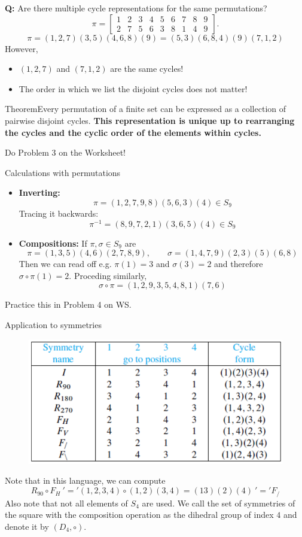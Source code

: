 \documentclass{beamer}
\def\bl[#1]#2{\begin{block}{#1}#2\end{block}}
\def\itemb{\begin{itemize}}
\def\iteme{\end{itemize}}
\begin{document}
\begin{frame}
\textbf{Q:} Are there multiple cycle representations for the same permutations?
\[
\pi=\left[\begin{array}{ccccccccc}
1&2&3&4&5&6&7&8&9\\
2&7&5&6&3&8&1&4&9
\end{array}\right].
\]
\[
\pi=(1,2,7)(3,5)(4,6,8)(9)=(5,3)(6,8,4)(9)(7,1,2)
\]
However,
\itemb
\item $(1,2,7)$ and $(7,1,2)$ are the same cycles!
\item The order in which we list the disjoint cycles does not matter!
\iteme

\bl[Theorem]{Every permutation of a finite set can be expressed as a collection of pairwise disjoint cycles. \textbf{This representation is unique up to rearranging the cycles and the cyclic order of the elements within cycles.}}
\center Do Problem 3 on the Worksheet!
\end{frame}

\begin{frame}{Calculations with permutations}
\itemb
\item \textbf{Inverting:}
\[
\pi=(1,2,7,9,8)(5,6,3)(4)\in S_9
\]
Tracing it backwards:
\[
\pi^{-1}=(8,9,7,2,1)(3,6,5)(4)\in S_9
\]
\item \textbf{Compositions:}
If $\pi,\sigma\in S_9$ are
\[
\pi=(1,3,5)(4,6)(2,7,8,9),\qquad \sigma=(1,4,7,9)(2,3)(5)(6,8)
\]
Then we can read off e.g. $\pi(1)=3$ and $\sigma(3)=2$ and therefore $\sigma\circ\pi(1)=2$. Proceding similarly,
\[
\sigma\circ\pi=(1,2,9,3,5,4,8,1)(7,6)
\]
\iteme

\begin{center}
Practice this in Problem 4 on WS.
\end{center}
\end{frame}

\begin{frame}{Application to symmetries}
\begin{figure}
\centering
\includegraphics[scale=0.6]{aspermfull.pdf}
\end{figure}\vspace{-0.3cm}
Note that in this language, we can compute
\[
R_{90}\circ F_H~ '=' (1,2,3,4)\circ (1,2)(3,4)=(1 3)(2)(4)~'='F_/
\]
Also note that not all elements of $S_4$ are used. We call the set of symmetries of the square with the composition operation as the \textrm{dihedral group} of index $4$ and denote it by $(D_4,\circ)$.
\end{frame}
\end{document}
